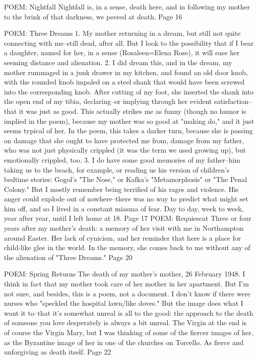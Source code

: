POEM: Nightfall
Nightfall is, in a sense, death here, and in following my mother to the brink of that darkness, we peered at death. Page 16

POEM: Three Dreams
1. My mother returning in a dream, but still not quite connecting with me--still dead, after all. But I look to the possibility that if I bear a daughter, named for her, in a sense (Rosaleen=Elena Rose), it will ease her seeming distance and alienation.
2. I did dream this, and in the dream, my mother rummaged in a junk drawer in my kitchen, and found an old door knob, with the rounded knob impaled on a steel shank that would have been screwed into the corresponding knob. After cutting of my foot, she inserted the shank into the open end of my tibia, declaring--or implying through her evident satisfaction--that it was just as good. This actually strikes me as funny (though no humor is implied in the poem), because my mother was so good at "making do," and it just seems typical of her. In the poem, this takes a darker turn, because she is passing on damage that she ought to have protected me from, damage from my father, who was not just physically crippled (it was the term we used growing up), but emotionally crippled, too.
3. I do have some good memories of my father--him taking us to the beach, for example, or reading us his version of children's bedtime stories: Gogol's "The Nose," or Kafka's "Metamorphosis" or "The Penal Colony." But I mostly remember being terrified of his rages and violence. His anger could explode out of nowhere--there was no way to predict what might set him off, and so I lived in a constant miasma of fear. Day to day, week to week, year after year, until I left home at 18. Page 17
POEM: Requiescat
Three or four years after my mother's death: a memory of her visit with me in Northampton around Easter. Her lack of cynicism, and her reminder that here is a place for child-like glee in the world. In the memory, she comes back to me without any of the alienation of "Three Dreams." Page 20

POEM: Spring Returns
The death of my mother's mother, 26 February 1948.
I think in fact that my mother took care of her mother in her apartment. But I'm not sure, and besides, this is a poem, not a document. I don't know if there were nurses who "speckled the hospital lawn/like doves." But the image does what I want it to--that it's somewhat unreal is all to the good: the approach to the death of someone you love desperately is always a bit unreal. The Virgin at the end is of course the Virgin Mary, but I was thinking of some of the fiercer images of her, as the Byzantine image of her in one of the churches on Torcello. As fierce and unforgiving as death itself. Page 22

